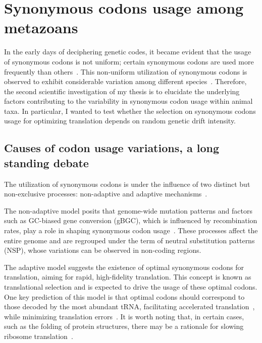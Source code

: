 \section{Synonymous codons usage among metazoans}

In the early days of deciphering genetic codes, it became evident that the usage of synonymous \gls{codon}s is not uniform; certain synonymous codons are used more frequently than others~\citep{grantham_codon_1980, grantham_codon_1980-1, ikemura_correlation_1981, gouy_codon_1982, sharp_codon_1988, mouchiroud_compositional_1988}. This non-uniform utilization of synonymous codons is observed to exhibit considerable variation among different species~\citep{duret_expression_1999}. Therefore, the second scientific investigation of my thesis is to elucidate the underlying factors contributing to the variability in synonymous codon usage within animal taxa. In particular, I wanted to test whether the selection on synonymous codons usage for optimizing translation depends on random genetic drift intensity.

\subsection{Causes of codon usage variations, a long standing debate}

The utilization of synonymous codons is under the influence of two distinct but non-exclusive processes: non-adaptive and adaptive mechanisms~\citep{bulmer_selection-mutation-drift_1991, duret_trna_2000, duret_evolution_2002, plotkin_synonymous_2011, doherty_translational_2013, parvathy_codon_2022}. 

The non-adaptive model posits that genome-wide mutation patterns and factors such as GC-\gls{biased gene conversion} (\acrshort{gBGC}), which is influenced by recombination rates, play a role in shaping synonymous codon usage~\citep{ikemura_correlation_1981, kanaya_codon_2001, chen_codon_2004, pouyet_recombination_2017}. These processes affect the entire genome and are regrouped under the term of neutral \gls{substitution} patterns (\acrshort{NSP}), whose variations can be observed in non-coding regions.

The adaptive model suggests the existence of optimal synonymous codons for translation, aiming for rapid, high-fidelity translation. This concept is known as \gls{translational selection} and is expected to drive the usage of these optimal codons. One key prediction of this model is that optimal codons should correspond to those decoded by the most abundant tRNA, facilitating accelerated translation~\citep{akashi_synonymous_1994, drummond_mistranslation-induced_2008, hershberg_selection_2008, morris_ribosome_2021}, while minimizing translation errors~\citep{stoletzki_synonymous_2007, kramer_frequency_2007, sun_preferred_2022}. It is worth noting that, in certain cases, such as the folding of protein structures, there may be a rationale for slowing ribosome translation~\citep{yu_codon_2015, liu_code_2020,  weinberg_improved_2016, hussmann_understanding_2015}.


